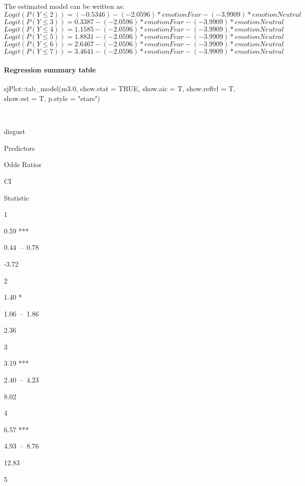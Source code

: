\documentclass[
]{article}
\newenvironment{Shaded}{\begin{snugshade}}{\end{snugshade}}
\newcommand{\AttributeTok}[1]{\textcolor[rgb]{0.77,0.63,0.00}{#1}}
\newcommand{\ConstantTok}[1]{\textcolor[rgb]{0.00,0.00,0.00}{#1}}
\newcommand{\FloatTok}[1]{\textcolor[rgb]{0.00,0.00,0.81}{#1}}
\newcommand{\FunctionTok}[1]{\textcolor[rgb]{0.00,0.00,0.00}{#1}}
\newcommand{\NormalTok}[1]{#1}
\newcommand{\SpecialCharTok}[1]{\textcolor[rgb]{0.00,0.00,0.00}{#1}}
\newcommand{\StringTok}[1]{\textcolor[rgb]{0.31,0.60,0.02}{#1}}
\begin{document}
The estimated model can be written as:
\[Logit(P(Y\le 2))= (-0.5346) - (-2.0596)*emotionFear - (-3.9909)*emotionNeutral\]
\[Logit(P(Y\le 3))= 0.3387 - (-2.0596)*emotionFear - (-3.9909)*emotionNeutral\]
\[Logit(P(Y\le 4))= 1.1585 - (-2.0596)*emotionFear - (-3.9909)*emotionNeutral\]
\[Logit(P(Y\le 5))= 1.8831 - (-2.0596)*emotionFear - (-3.9909)*emotionNeutral\]
\[Logit(P(Y\le 6))= 2.6467 - (-2.0596)*emotionFear - (-3.9909)*emotionNeutral\]
\[Logit(P(Y\le 7))= 3.4641 - (-2.0596)*emotionFear - (-3.9909)*emotionNeutral\]

\hypertarget{regression-summary-table}{%
\paragraph{Regression summary table}\label{regression-summary-table}}

\begin{Shaded}
\begin{Highlighting}[]
\NormalTok{sjPlot}\SpecialCharTok{::}\FunctionTok{tab\_model}\NormalTok{(m3}\FloatTok{.0}\NormalTok{, }\AttributeTok{show.stat =} \ConstantTok{TRUE}\NormalTok{, }\AttributeTok{show.aic =}\NormalTok{ T, }\AttributeTok{show.reflvl =}\NormalTok{ T, }\AttributeTok{show.est =}\NormalTok{ T, }\AttributeTok{p.style =} \StringTok{"stars"}\NormalTok{)}
\end{Highlighting}
\end{Shaded}

~

disgust

Predictors

Odds Ratios

CI

Statistic

1

0.59 ***

0.44~--~0.78

-3.72

2

1.40 *

1.06~--~1.86

2.36

3

3.19 ***

2.40~--~4.23

8.02

4

6.57 ***

4.93~--~8.76

12.83

5
\end{document}
